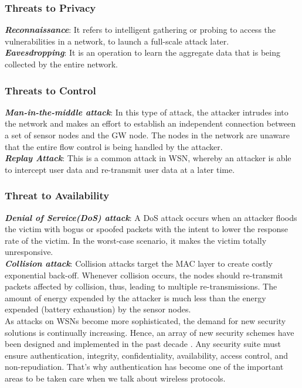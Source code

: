 \documentclass[a4paper,12pt]{report}
\begin{document}
\subsubsection{Threats to Privacy}
\textbf{\textit{Reconnaissance}}: It refers to intelligent gathering
or probing to access the vulnerabilities in a network, to launch a
full-scale attack later. \\

\noindent \textbf{\textit{Eavesdropping}}: It is an operation to
learn the aggregate data that is being collected by the entire network.\\

\subsubsection{Threats to Control}
\noindent\textbf{\textit{Man-in-the-middle attack}}: In this type of
attack, the attacker intrudes into the network and makes an effort
to establish an independent connection between a set of sensor nodes
and the GW node. The nodes in the network are unaware that the
entire flow control is being handled by the attacker. \\

\noindent\textbf{\textit{Replay Attack}}: This is a common attack in
WSN, whereby an attacker is able to intercept user
data and re-transmit user data at a later time.\\

\subsubsection{Threat to Availability}
\noindent\textbf{\textit{Denial of Service(DoS) attack}}: A DoS
attack occurs when an attacker floods the victim with bogus or
spoofed packets with the intent to lower the response rate of the
victim. In the worst-case scenario, it makes the victim
totally unresponsive.\\

\noindent \textbf{\textit{Collision attack}}: Collision attacks
target the MAC layer to create costly exponential back-off. Whenever
collision occurs, the nodes should re-transmit packets affected by
collision, thus, leading to multiple re-transmissions. The amount of
energy expended by the attacker is much less than the energy
expended (battery exhaustion) by the sensor nodes.\\

As attacks on WSNs become more sophisticated, the demand for new
security solutions is continually increasing. Hence, an array of new
security schemes have been designed and implemented in the past
decade \cite{perrig}\cite{healy}. Any security suite must ensure
authentication, integrity, confidentiality, availability, access
control, and non-repudiation. That's why authentication has become
one of the important areas to be taken care when we talk about
wireless protocols.
\end{document}
